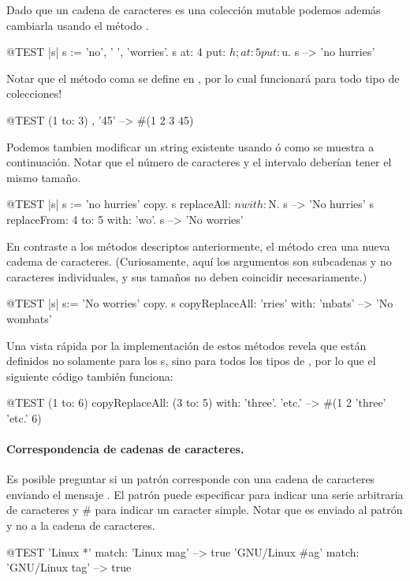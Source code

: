 \documentclass[a4paper,10pt,twoside]{book}
\begin{document}
Dado que un cadena de caracteres es una colecci\'on mutable podemos adem\'as cambiarla usando el m\'etodo .

\begin{code}{@TEST |s| s := 'no', ' ', 'worries'.}
s at: 4 put: $h; at: 5 put: $u.
s --> 'no hurries'
\end{code}

Notar que el m\'etodo coma se define en , por lo cual funcionar\'a para todo tipo de colecciones!
\begin{code}{@TEST}
(1 to: 3) , '45' --> #(1 2 3 $4 $5)
\end{code}

Podemos tambien modificar un string existente usando  \'o  como se muestra a continuaci\'on. Notar que el n\'umero de caracteres y el intervalo deber\'ian tener el mismo tama\~{n}o.

\begin{code}{@TEST |s| s := 'no hurries' copy.}
s replaceAll: $n with: $N.
s --> 'No hurries'
s replaceFrom: 4 to: 5 with: 'wo'.
s --> 'No worries'
\end{code}

En contraste a los m\'etodos descriptos anteriormente, el m\'etodo  crea una nueva cadema de caracteres.
(Curiosamente, aqu\'i los argumentos son subcadenas y no caracteres individuales, y sus tama\~{n}os no deben coincidir necesariamente.)

\begin{code}{@TEST |s| s:= 'No worries' copy.}
s copyReplaceAll: 'rries' with: 'mbats' --> 'No wombats'
\end{code}

Una vista r\'apida por la implementaci\'on de estos m\'etodos revela que est\'an definidos no solamente para los s, sino para todos los tipos de , por lo que el siguiente c\'odigo tambi\'en funciona:

\begin{code}{@TEST}
(1 to: 6) copyReplaceAll: (3 to: 5) with: { 'three'. 'etc.' } --> #(1 2 'three' 'etc.' 6)
\end{code}

\paragraph{Correspondencia de cadenas de caracteres.}
Es posible preguntar si un patr\'on corresponde con una cadena de caracteres enviando el mensaje .
El patr\'on puede especificar \ct{*} para indicar una serie arbitraria de caracteres y \# para indicar un caracter simple. Notar que  es enviado al patr\'on y no a la cadena de caracteres.
\begin{code}{@TEST}
'Linux *' match: 'Linux mag'                      --> true
'GNU/Linux #ag' match: 'GNU/Linux tag' --> true
\end{code}
\end{document}
